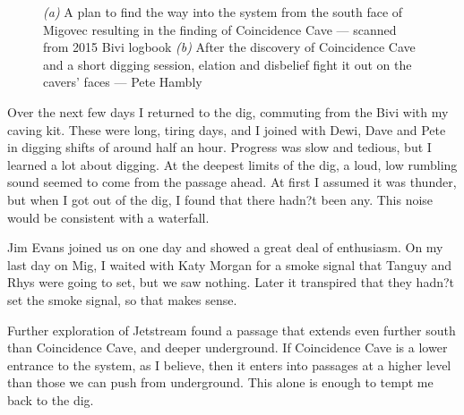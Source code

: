 \begin{figure}[t!]
\begin{subfigure}{0.346\textwidth}
            \caption{}\label{coincidence cave}
        \end{subfigure}

        \caption{
            \emph{(a)} A plan to find the way into the system from the south face of Migovec resulting in the finding of Coincidence Cave --- scanned from 2015 Bivi logbook
            \emph{(b)} After the discovery of Coincidence Cave and a short digging session, elation and disbelief fight it out on the cavers' faces --- Pete Hambly}
        \label{}

    \end{figure}

    Over the next few days I returned to the dig, commuting from the Bivi with my caving kit. These were long, tiring days, and I joined with Dewi, Dave and Pete in digging shifts of around half an hour. Progress was slow and tedious, but I learned a lot about digging. At the deepest limits of the dig, a loud, low rumbling sound seemed to come from the passage ahead. At first I assumed it was thunder, but when I got out of the dig, I found that there hadn?t been any. This noise would be consistent with a waterfall.

    Jim Evans joined us on one day and showed a great deal of enthusiasm. On my last day on Mig, I waited with Katy Morgan for a smoke signal that Tanguy and Rhys were going to set, but we saw nothing. Later it transpired that they hadn?t set the smoke signal, so that makes sense.

    Further exploration of Jetstream found a passage that extends even further south than Coincidence Cave, and deeper underground. If Coincidence Cave is a lower entrance to the system, as I believe, then it enters into passages at a higher level than those we can push from underground. This alone is enough to tempt me back to the dig.

